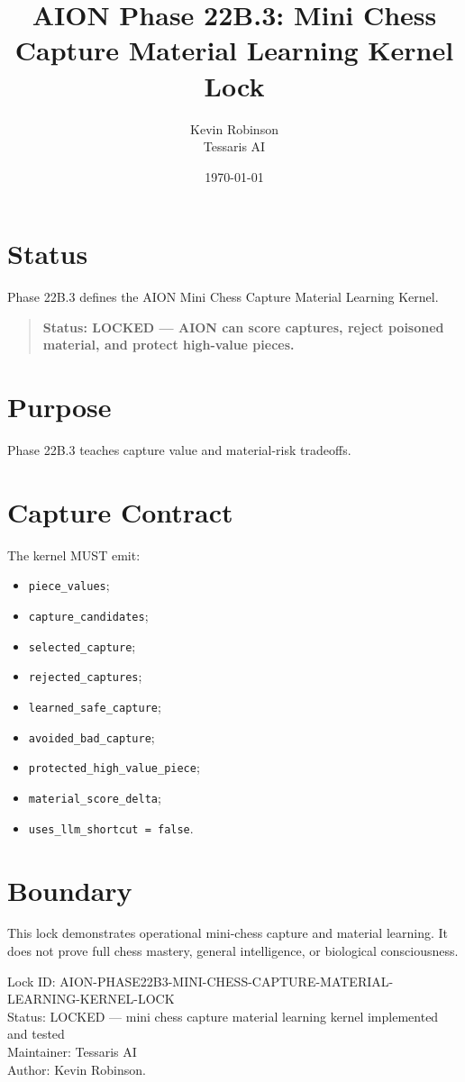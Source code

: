 \documentclass[11pt,a4paper]{article}
\title{\textbf{AION Phase 22B.3: Mini Chess Capture Material Learning Kernel Lock}}
\author{Kevin Robinson\\Tessaris AI}
\date{\today}
\begin{document}
\maketitle

\section{Status}

Phase 22B.3 defines the AION Mini Chess Capture Material Learning Kernel.

\begin{quote}
\textbf{Status: LOCKED --- AION can score captures, reject poisoned material, and protect high-value pieces.}
\end{quote}

\section{Purpose}

Phase 22B.3 teaches capture value and material-risk tradeoffs.

\section{Capture Contract}

The kernel MUST emit:

\begin{itemize}
  \item \texttt{piece\_values};
  \item \texttt{capture\_candidates};
  \item \texttt{selected\_capture};
  \item \texttt{rejected\_captures};
  \item \texttt{learned\_safe\_capture};
  \item \texttt{avoided\_bad\_capture};
  \item \texttt{protected\_high\_value\_piece};
  \item \texttt{material\_score\_delta};
  \item \texttt{uses\_llm\_shortcut = false}.
\end{itemize}

\section{Boundary}

This lock demonstrates operational mini-chess capture and material learning. It does not prove full chess mastery, general intelligence, or biological consciousness.

\bigskip

\noindent
Lock ID: AION-PHASE22B3-MINI-CHESS-CAPTURE-MATERIAL-LEARNING-KERNEL-LOCK\\
Status: LOCKED --- mini chess capture material learning kernel implemented and tested\\
Maintainer: Tessaris AI\\
Author: Kevin Robinson.
\end{document}
